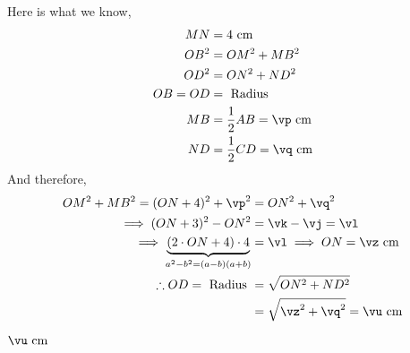 \begin{solution}[\halfpage]
	Here is what we know,
	\begin{align}
		MN &= \vc\text{ cm} \\
		OB^2 &= OM^2 + MB^2 \\
		OD^2 &= ON^2 + ND^2 \\
		OB = OD &= \text{ Radius } \\
		MB &= \frac{1}{2}AB = \vp\text{ cm} \\
		ND &= \frac{1}{2}CD = \vq\text{ cm}
	\end{align}
	And therefore, 
	\begin{align}
		OM^2 + MB^2 = (ON + \vc)^2 + \vp^2 &= ON^2 + \vq^2 \\
		\implies (ON+3)^2 - ON^2 &= \vk - \vj = \vl \\
		\implies \underbrace{(2\cdot ON + \vc)\cdot \vc}_{a^2-b^2 = (a-b)(a+b)} &= \vl \implies ON = \vz\text{ cm} \\
		\therefore OD = \text{ Radius } &= \sqrt{ON^2 + ND^2} \\ 
		&= \sqrt{\vz^2 + \vq^2} = \vu\text{ cm} 
	\end{align}
\end{solution}

\ifprintanswers\begin{codex}$\vu\text{ cm}$\end{codex}\fi
